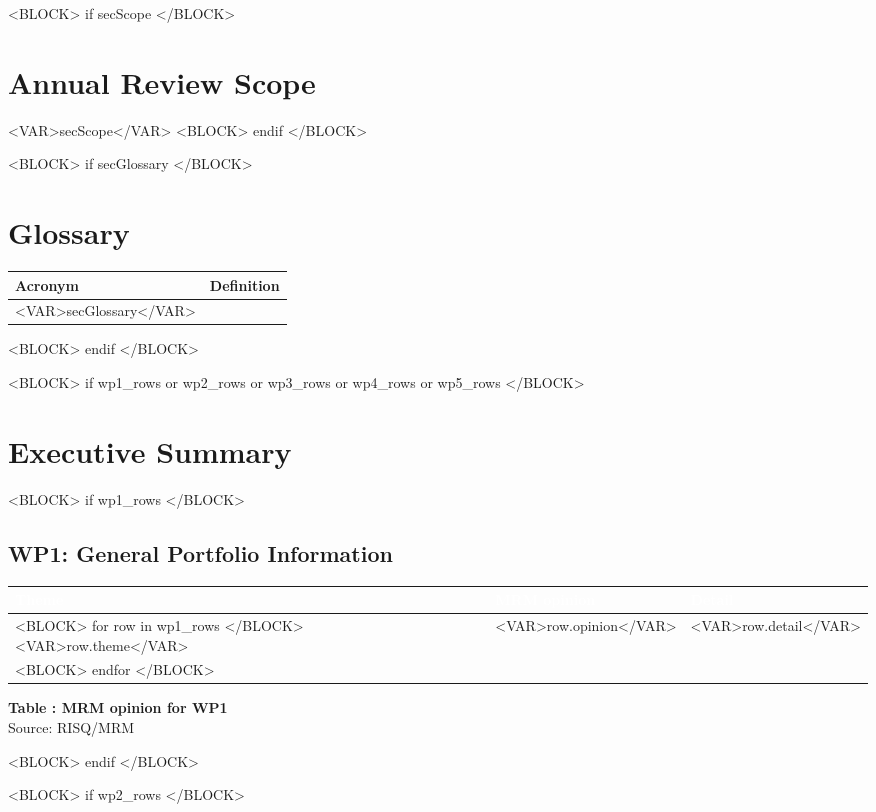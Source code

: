 \documentclass[10pt, a4paper]{article}
\newcounter{tableCounter}
\begin{document}
<BLOCK> if secScope </BLOCK>
\section{Annual Review Scope}
<VAR>secScope</VAR>
<BLOCK> endif </BLOCK>

<BLOCK> if secGlossary </BLOCK>
\section{Glossary}
\noindent\begin{tabularx}{\textwidth}{|>{\centering\arraybackslash}p{4cm}|X|}
\hline
\rowcolor{sggray}
\centering\textbf{Acronym} & \centering\arraybackslash\textbf{Definition} \\
\hline
<VAR>secGlossary</VAR>
\hline
\end{tabularx}
<BLOCK> endif </BLOCK>

<BLOCK> if wp1_rows or wp2_rows or wp3_rows or wp4_rows or wp5_rows </BLOCK>
\section{Executive Summary}
<BLOCK> if wp1_rows </BLOCK>
\subsection{WP1: General Portfolio Information}
\noindent\begin{tabularx}{\textwidth}{|>{\centering\arraybackslash}p{3.5cm}|>{\centering\arraybackslash}p{3.5cm}|X|}
\hline
\rowcolor{sgred}
\centering\textcolor{white}{\textbf{Theme}} & \centering\textcolor{white}{\textbf{MRM opinion}} & \centering\arraybackslash\textcolor{white}{\textbf{Detail}} \\
\hline
<BLOCK> for row in wp1_rows </BLOCK>
<VAR>row.theme</VAR> & <VAR>row.opinion</VAR> & <VAR>row.detail</VAR> \\
\hline
<BLOCK> endfor </BLOCK>
\end{tabularx}
\begin{center}
\scriptsize \textbf{Table \thetableCounter: MRM opinion for WP1} \\
Source: RISQ/MRM
\end{center}
\vspace{0.3cm}
<BLOCK> endif </BLOCK>

<BLOCK> if wp2_rows </BLOCK>
\end{document}
